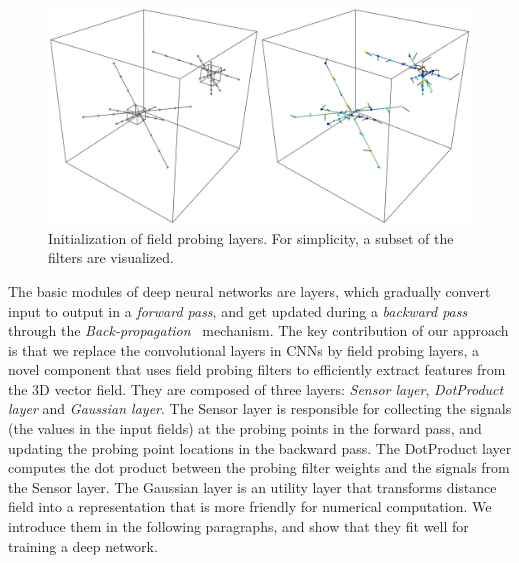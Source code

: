 \begin{figure}
	\vspace{-1.8cm}
	\begin{center}
		\includegraphics[width=0.9\linewidth]{figures/initialization}
	\end{center}
	\vspace{-0.4cm}
	\caption{Initialization of field probing layers. For simplicity, a subset of the filters are visualized.}
	\label{fig:initialization}
	\vspace{-0.3cm}
\end{figure}

The basic modules of deep neural networks are layers, which gradually convert input to output in a \emph{forward pass}, and get updated during a \emph{backward pass} through the \emph{Back-propagation}~\cite{Williams_Nature86_Learning} mechanism.
%
%
The key contribution of our approach is that we replace the convolutional layers in CNNs by field probing layers, a novel component that uses field probing filters to efficiently extract features from the 3D vector field. They are composed of three layers: \emph{Sensor layer}, \emph{DotProduct layer} and \emph{Gaussian layer}. The Sensor layer is responsible for collecting the signals (the values in the input fields) at the probing points in the forward pass, and updating the probing point locations in the backward pass. The DotProduct layer computes the dot product between the probing filter weights and the signals from the Sensor layer. The Gaussian layer is an utility layer that transforms distance field into a representation that is more friendly for numerical computation. We introduce them in the following paragraphs, and show that they fit well for training a deep network.

